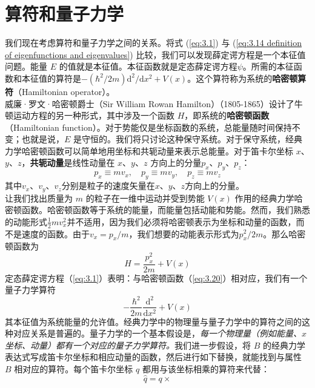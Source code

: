 \section{算符和量子力学}
	我们现在考虑算符和量子力学之间的关系。将式 (\ref{eq:3.1}) 与 (\ref{eq:3.14 definition of eigenfunctions and eigenvalues}) 比较，我们可以发现薛定谔方程是一个本征值问题。能量 $E$ 的值就是本征值。本征函数就是定态薛定谔方程$\psi$。所需的本征函数和本征值的算符是$-\left(\hbar^2/2m\right)\mathrm{d}^2/\mathrm{d}x^2+V\left(x\right)$。这个算符称为系统的\textbf{哈密顿算符}（Hamiltonian operator）。\\
	\indent 威廉·罗文·哈密顿爵士（Sir William Rowan Hamilton）（1805-1865）设计了牛顿运动方程的另一种形式，其中涉及一个函数 $H$，即系统的\textbf{哈密顿函数}（Hamiltonian function）。对于势能仅是坐标函数的系统，总能量随时间保持不变；也就是说，$E$ 是守恒的。我们将只讨论这种保守系统。对于保守系统，经典力学哈密顿函数可以简单地用坐标和共轭动量来表示总能量。对于笛卡尔坐标 $x$、$y$、$z$，\textbf{共轭动量}是线性动量在 $x$、$y$、$z$ 方向上的分量$p_x$、$p_y$、$p_z$：
	\begin{equation}
		\boxed{
			p_x \equiv mv_x, \quad p_y \equiv mv_y, \quad p_z \equiv mv_z
		}
		\label{eq:3.19}
	\end{equation}
	其中$v_x$、$v_y$、$v_z$分别是粒子的速度矢量在$x$、$y$、$z$方向上的分量。\\
	\indent 让我们找出质量为 $m$ 的粒子在一维中运动并受到势能 $V\left(x\right)$ 作用的经典力学哈密顿函数。哈密顿函数等于系统的能量，而能量包括动能和势能。然而，我们熟悉的动能形式$\frac{1}{2}mv_x^2$并不适用，因为我们必须将哈密顿表示为坐标和动量的函数，而不是速度的函数。由于$v_x = p_x/m$，我们想要的动能表示形式为$p_x^2/2m$。那么哈密顿函数为
	\begin{equation}
		H = \frac{p_x^2}{2m}+V\left(x\right)
		\label{eq:3.20}
	\end{equation}
	\indent 定态薛定谔方程（\ref{eq:3.1}）表明：与哈密顿函数（\ref{eq:3.20}）相对应，我们有一个量子力学算符
	\begin{equation*}
		-\frac{\hbar^2}{2m}\frac{\mathrm{d}^2}{\mathrm{d}x^2}+V\left(x\right)
	\end{equation*}
	其本征值为系统能量的允许值。经典力学中的物理量与量子力学中的算符之间的这种对应关系是普遍的。量子力学的一个基本假设是，\textit{每一个物理量（例如能量、$x$ 坐标、动量）都有一个对应的量子力学算符。}我们进一步假设，将 $B$ 的经典力学表达式写成笛卡尔坐标和相应动量的函数，然后进行如下替换，就能找到与属性 $B$ 相对应的算符。每个笛卡尔坐标 $q$ 都用与该坐标相乘的算符来代替：
	\begin{equation*}
		\hat{q} = q \times
	\end{equation*}
